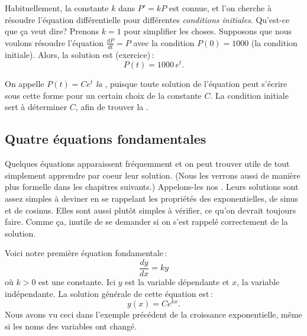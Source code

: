 Habituellement, la constante $k$ dans $P' = kP$ est connue, et l'on cherche \`a r\'esoudre l'\'equation diff\'erentielle pour diff\'erentes \emph{conditions initiales}.  Qu'est-ce que \c{c}a veut dire?  Prenons $k=1$ pour simplifier les choses.  Supposons que nous voulons r\'esoudre l'\'equation 
$\frac{dP}{dt} = P$ 
avec la condition $P(0) = 1000$ (la condition initiale).
Alors, la solution est (exercice)\,: 
\begin{equation*}
P(t) = 1000 \, e^t .
\end{equation*}



On appelle $P(t) = C e^t$ \emph{la },
puisque toute solution de l'\'equation peut s'\'ecrire sous cette forme pour un certain choix de la constante $C$.  La condition initiale sert \`a d\'eterminer $C$, afin de trouver la 
\emph{}.  

\subsection{Quatre \'equations fondamentales} \label{subsection:fourfundamental}

Quelques \'equations apparaissent fr\'equemment et on peut trouver utile de tout simplement apprendre par coeur leur solution.  (Nous les verrons aussi de mani\`ere plus formelle dans les chapitres suivants.)  Appelons-les nos . Leurs solutions sont assez simples \`a deviner en se rappelant les propri\'et\'es des exponentielles, de sinus et de cosinus.  Elles sont aussi plut\^ot simples \`a v\'erifier, ce qu'on devrait toujours faire.  Comme \c{c}a, inutile de se demander si on s'est rappel\'e correctement de la solution.

\medskip

Voici notre premi\`ere \'equation fondamentale\,: 
\begin{equation*}
\frac{dy}{dx} = k y 
\end{equation*}
o\`u $k > 0$ est une constante.
Ici $y$ est la variable d\'ependante et $x$, la variable ind\'ependante.
La solution g\'en\'erale de cette \'equation est\,: 
\begin{equation*}
y(x) = C e^{kx} .
\end{equation*}
Nous avons vu ceci dans l'exemple pr\'ec\'edent de la croissance exponentielle, m\^eme si les noms des variables ont chang\'e.

